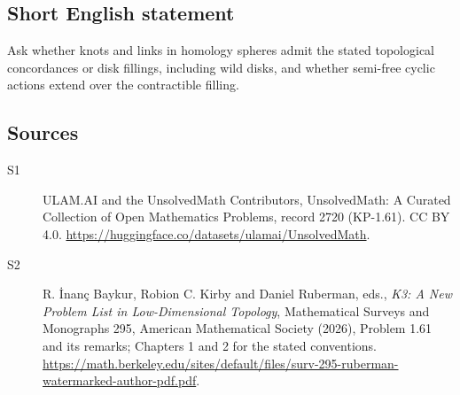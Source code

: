 \documentclass[11pt]{article}
\begin{document}
\subsection{Short English statement}
Ask whether knots and links in homology spheres admit the stated topological concordances or disk fillings, including wild disks, and whether semi-free cyclic actions extend over the contractible filling.
\subsection{Sources}
\begin{description}
\item[\hypertarget{source:2720:1}{S1}] ULAM.AI and the UnsolvedMath Contributors, UnsolvedMath: A Curated Collection of Open Mathematics Problems, record 2720 (KP-1.61). CC BY 4.0. \url{https://huggingface.co/datasets/ulamai/UnsolvedMath}.
\item[\hypertarget{source:2720:2}{S2}] R. İnanç Baykur, Robion C. Kirby and Daniel Ruberman, eds., \emph{K3: A New Problem List in Low-Dimensional Topology}, Mathematical Surveys and Monographs 295, American Mathematical Society (2026), Problem 1.61 and its remarks; Chapters 1 and 2 for the stated conventions. \url{https://math.berkeley.edu/sites/default/files/surv-295-ruberman-watermarked-author-pdf.pdf}.
\end{description}
\label{end:2720}
\end{document}
